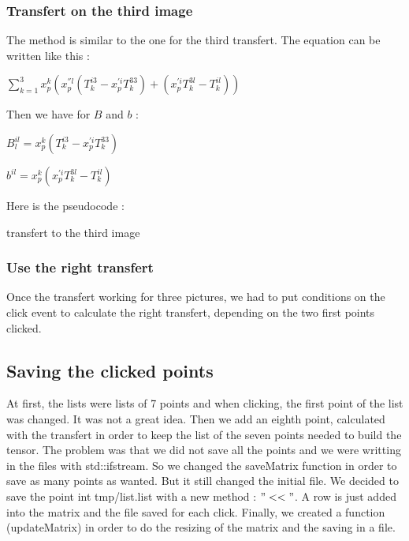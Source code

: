 \documentclass{report}
\begin{document}
\subsubsection{Transfert on the third image}
The method is similar to the one for the third transfert.
The equation can be written like this : 

\begin{center}
 $ \displaystyle { \sum_{k = 1}^{3}} x_{p}^{k}(x_{p}^{''l}(T_{k}^{i3} - x_{p}^{'i}T_{k}^{33}) + ( x_{p}^{'i}T_{k}^{3l} - T_{k}^{il}))$ 
\end{center}

Then we have for $B$ and $b$ :  
\begin{center}
$B_{l}^{il} = x_{p}^{k}(T_{k}^{i3} - x_{p}^{'i}T_{k}^{33})$
\end{center}
\begin{center}
$b^{il} = x_{p}^{k}(x_{p}^{'i}T_{k}^{3l} - T_{k}^{il})$
\end{center}

Here is the pseudocode : 
\begin{algorithm}
\SetLine
\caption{transfert to the third image}
\SetLine
{}
\end{algorithm}
\subsubsection{Use the right transfert}
Once the transfert working for three pictures, we had to put conditions on the click event to calculate the right transfert, depending on the two first points clicked.  

 
\textcolor{subtitle}{\subsection{Saving the clicked points}}
At first, the lists were lists of 7 points and when clicking, the first point of the list was changed. It was not a great idea. 
Then we add an eighth point, calculated with the transfert in order to keep the list of the seven points needed to build the tensor. The problem was that we did not save all the points and we were writting in the files with std::ifstream. So we changed the saveMatrix function in order to save as many points as wanted. But it still changed the initial file. 
We decided to save the point int tmp/list.list with a new method : $" << "$. A row is just added into the matrix and the file saved for each click. 
Finally, we created a function (updateMatrix) in order to do the resizing of the matrix and the saving in a file. 
\end{document}
